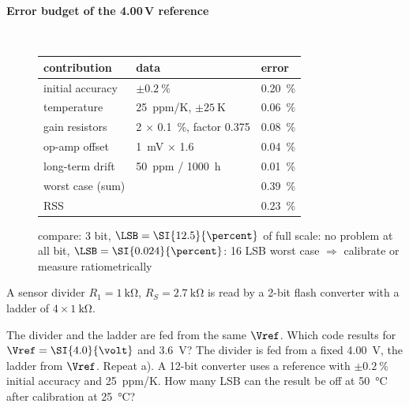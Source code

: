 \begin{description}
\item[{\rot\bf Error budget of the 4.00\,V reference}]~\\[-\lblskip]
\begin{center}
\begin{tabular}{lll}
\toprule
contribution & data & error \\
\midrule
initial accuracy & $\pm\SI{0.2}{\percent}$ & \SI{0.20}{\percent} \\
temperature & \SI{25}{ppm/K}, $\pm\SI{25}{\kelvin}$ & \SI{0.06}{\percent} \\
gain resistors & 2 $\times$ \SI{0.1}{\percent}, factor 0.375 & \SI{0.08}{\percent} \\
op-amp offset & \SI{1}{\milli\volt} $\times$ 1.6 & \SI{0.04}{\percent} \\
long-term drift & \SI{50}{ppm} / \SI{1000}{\hour} & \SI{0.01}{\percent} \\
\midrule
worst case (sum) & & \SI{0.39}{\percent} \\
RSS & & \SI{0.23}{\percent} \\
\bottomrule
\end{tabular}
\end{center}
\bi
	\ite compare: 3 bit, $\LSB = \SI{12.5}{\percent}$ of full scale: no problem at all
	 bit, $\LSB = \SI{0.024}{\percent}$: 16 LSB worst case $\Rightarrow$ calibrate or measure ratiometrically
\ei
{}
\os{\newpage}
\end{description}

A sensor divider $R_1 = \SI{1}{\kilo\ohm}$, $R_S = \SI{2.7}{\kilo\ohm}$ is read
by a 2-bit flash converter with a ladder of $4\times\SI{1}{\kilo\ohm}$.
\begin{talist}
\ta The divider and the ladder are fed from the same $\Vref$. Which code results for $\Vref = \SI{4.0}{\volt}$ and \SI{3.6}{\volt}?
\ta The divider is fed from a fixed \SI{4.00}{\volt}, the ladder from $\Vref$. Repeat a).
\ta A 12-bit converter uses a reference with $\pm\SI{0.2}{\percent}$ initial accuracy and \SI{25}{ppm/K}.
	How many LSB can the result be off at \SI{50}{\celsius} after calibration at \SI{25}{\celsius}?
\end{talist}

